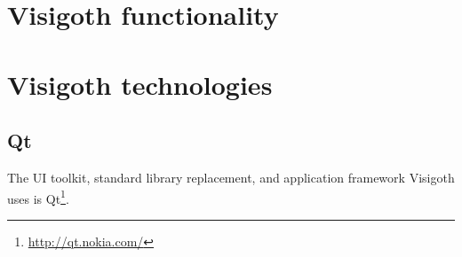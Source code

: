 \documentclass[a4paper,11pt,titlepage]{article}
\let\stdsection\section         %
\renewcommand{\section}{\newpage\stdsection}
\begin{document}
\section{Visigoth functionality}




\section{Visigoth technologies}

\subsection{Qt}

The UI toolkit, standard library replacement, and application
framework Visigoth uses is Qt\footnote{\url{http://qt.nokia.com/}}.
\end{document}
